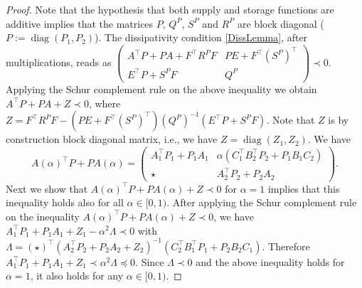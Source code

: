 \documentclass[10pt,a4paper]{amsart}
\newcommand{\diag}{\operatorname{diag}}
\begin{document}
\begin{proof}
Note that the hypothesis that both supply and storage functions are additive implies that the matrices $P$, $Q^P$, $S^P$ and $R^P$ are block diagonal ($P:=\diag(P_1,P_2)$). The dissipativity condition \eqref{DissLemma}, after multiplications, reads as
$\left(\begin{smallmatrix}
A^\top P + P A + F^\top R^P F & P E + F^\top (S^P)^\top \\
E^\top P + S^P F & Q^P 
\end{smallmatrix}\right) \prec 0.$
Applying the Schur complement rule on the above inequality we obtain $A^\top P + P A + Z \prec 0$, where $Z=F^\top R^P F - (P E + F^\top (S^P)^\top) (Q^P)^{-1}(E^\top P + S^P F)$.
Note that $Z$ is by construction block diagonal matrix, i.e., we have $Z=\diag(Z_1,Z_2)$.
We have
\[
A(\alpha)^\top P + P A(\alpha)=\begin{pmatrix} A_1^\top P_1 + P_1 A_1 & \alpha (C_1^\top B_2^\top P_2 + P_1 B_1 C_2) 
\\ \star & A_2^\top P_2 + P_2 A_2 \end{pmatrix}.
\] 
Next we show that $A(\alpha)^\top P + P A(\alpha) + Z \prec 0$ for $\alpha =1$ implies that this inequality holds also for all $\alpha \in [0,1)$. 
After applying the Schur complement rule on the inequality $A(\alpha)^\top P + P A(\alpha) + Z \prec 0$, we have 
$A_1^\top P_1 + P_1 A_1 + Z_1 - \alpha^2 \Lambda \prec 0$ with
$\Lambda=(\star)^\top(A_2^\top P_2 + P_2 A_2 + Z_2)^{-1}(C_2^\top B_1^\top P_1 + P_2 B_2 C_1)$. Therefore $A_1^\top P_1 + P_1 A_1 + Z_1 \prec \alpha^2 \Lambda \preceq 0$.
Since $\Lambda \prec 0$ and the above inequality holds for $\alpha =1$, it also holds for any  $\alpha \in [0,1)$.
\end{proof}
\end{document}
